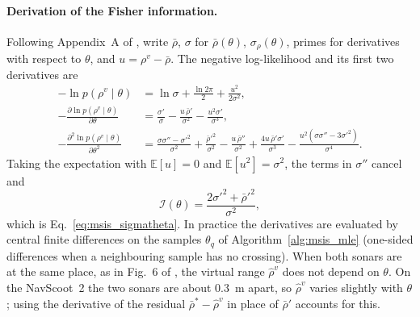 \paragraph{Derivation of the Fisher information.} Following Appendix~A of \citet{breux2020elevation},
write $\bar{\rho}$, $\sigma$ for $\bar{\rho}(\theta)$, $\sigma_\rho(\theta)$, primes for derivatives with
respect to $\theta$, and $u = \rho^v - \bar{\rho}$. The negative log-likelihood and its first two
derivatives are
\begin{align}                            %
  -\ln p(\rho^v \mid \theta) &= \ln\sigma + \frac{\ln 2\pi}{2} + \frac{u^2}{2\sigma^2},              \label{eq:msis_A1}\\
  -\frac{\partial \ln p(\rho^v \mid \theta)}{\partial\theta}
    &= \frac{\sigma'}{\sigma} - \frac{u\,\bar{\rho}'}{\sigma^2} - \frac{u^2\sigma'}{\sigma^3},        \label{eq:msis_A2}\\
  -\frac{\partial^2 \ln p(\rho^v \mid \theta)}{\partial\theta^2}
    &= \frac{\sigma\sigma'' - \sigma'^2}{\sigma^2} + \frac{\bar{\rho}'^2}{\sigma^2} - \frac{u\,\bar{\rho}''}{\sigma^2}
       + \frac{4u\,\bar{\rho}'\sigma'}{\sigma^3} - \frac{u^2(\sigma\sigma'' - 3\sigma'^2)}{\sigma^4}.   \label{eq:msis_A3}
\end{align}
Taking the expectation with $\mathbb{E}[u] = 0$ and $\mathbb{E}[u^2] = \sigma^2$, the terms in $\sigma''$
cancel and
\begin{equation}                         %
  \mathcal{I}(\theta) = \frac{2\sigma'^2 + \bar{\rho}'^2}{\sigma^2},
  \label{eq:msis_A5}
\end{equation}
which is Eq.~\eqref{eq:msis_sigmatheta}. In practice the derivatives are evaluated by central finite
differences on the samples $\theta_q$ of Algorithm~\ref{alg:msis_mle} (one-sided differences when a
neighbouring sample has no crossing). When both sonars are at the same place, as in Fig.~6 of
\citet{breux2020elevation}, the virtual range $\hat{\rho}^v$ does not depend on $\theta$. On the
NavScoot~2 the two sonars are about $0.3$~m apart, so $\hat{\rho}^v$ varies slightly with $\theta$;
using the derivative of the residual $\bar{\rho}^{*} - \hat{\rho}^v$ in place of $\bar{\rho}'$ accounts
for this.

